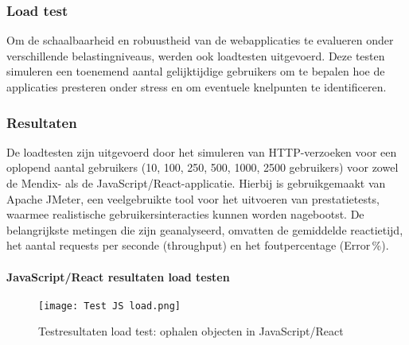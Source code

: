 \subsubsection{Load test}
Om de schaalbaarheid en robuustheid van de webapplicaties te evalueren onder verschillende belastingniveaus, werden ook loadtesten uitgevoerd. Deze testen simuleren een toenemend aantal gelijktijdige gebruikers om te bepalen hoe de applicaties presteren onder stress en om eventuele knelpunten te identificeren.

\subsubsection{Resultaten}
De loadtesten zijn uitgevoerd door het simuleren van HTTP-verzoeken voor een oplopend aantal gebruikers (10, 100, 250, 500, 1000, 2500 gebruikers) voor zowel de Mendix- als de JavaScript/React-applicatie. Hierbij is gebruikgemaakt van Apache JMeter, een veelgebruikte tool voor het uitvoeren van prestatietests, waarmee realistische gebruikersinteracties kunnen worden nagebootst. De belangrijkste metingen die zijn geanalyseerd, omvatten de gemiddelde reactietijd, het aantal requests per seconde (throughput) en het foutpercentage (Error \%).

\paragraph{JavaScript/React resultaten load testen}

\begin{figure}[H]
    \centering
    \captionsetup{justification=centering}
    \texttt{[image: Test JS load.png]}
    \caption[\centering Testresultaten load test: ophalen objecten in JavaScript/React]{\label{fig:loadtest-JavaScript} Testresultaten load test: ophalen objecten in JavaScript/React}
\end{figure}


